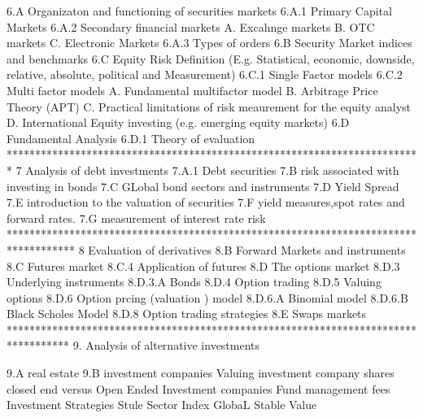 6.A Organizaton and functioning of securities markets
	6.A.1 Primary Capital Markets
	6.A.2 Secondary financial markets
		A. Excahnge markets
		B. OTC markets
		C. Electronic Markets 
	6.A.3 Types of orders
6.B Security Market indices and benchmarks
6.C Equity Risk Definition (E.g. Statistical, economic, downside, relative, absolute, political and Measurement)
	6.C.1 Single Factor models
	6.C.2 Multi factor models
		A. Fundamental multifactor model
		B. Arbitrage Price Theory (APT)
		C. Practical limitations of risk meaurement for the equity analyst
		D. International Equity investing (e.g. emerging equity markets)	
6.D Fundamental Analysis	
	6.D.1 Theory of evaluation
*************************************************************************
7 Analysis of debt investments
7.A.1 Debt securities
7.B risk associated with investing in bonds
7.C GLobal bond sectors and instruments
7.D Yield Spread
7.E introduction to the valuation of securities
7.F yield measures,spot rates and forward rates.
7.G measurement of interest rate risk
************************************************************************************
8 Evaluation of derivatives
8.B Forward Markets and instruments
8.C Futures market
8.C.4 Application of futures
8.D The options market
8.D.3 Underlying instruments
8.D.3.A Bonds
8.D.4 Option trading
8.D.5 Valuing options
8.D.6 Option prcing (valuation ) model
8.D.6.A Binomial model
8.D.6.B Black Scholes Model
8.D.8 Option trading strategies
8.E Swaps markets
***********************************************************************************
9. Analysis of alternative investments

9.A real estate
9.B investment companies
	Valuing investment company shares
	closed end versus Open Ended Investment companies
	Fund management fees
	Investment Strategies
		Stule
		Sector
		Index
		GlobaL 
	 	Stable Value
	

